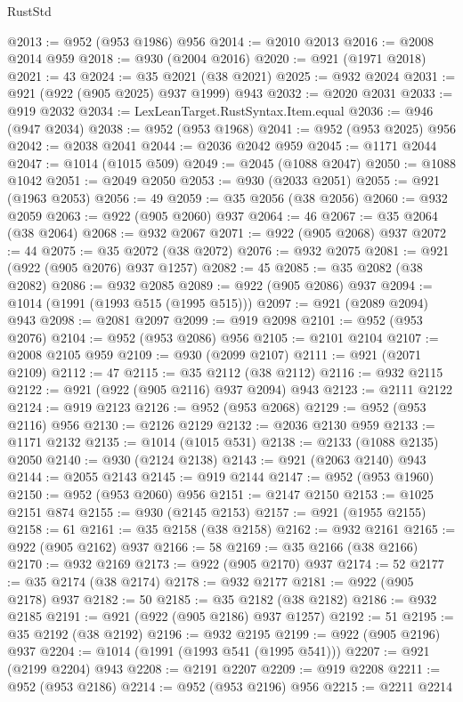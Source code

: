 \begin{lexlean}{RustStd}
\begin{coremodule}
@2013 := @952 (@953 @1986) @956
@2014 := @2010 @2013
@2016 := @2008 @2014 @959
@2018 := @930 (@2004 @2016)
@2020 := @921 (@1971 @2018)
@2021 := 43
@2024 := @35 @2021 (@38 @2021)
@2025 := @932 @2024
@2031 := @921 (@922 (@905 @2025) @937 @1999) @943
@2032 := @2020 @2031
@2033 := @919 @2032
@2034 := LexLeanTarget.RustSyntax.Item.equal
@2036 := @946 (@947 @2034)
@2038 := @952 (@953 @1968)
@2041 := @952 (@953 @2025) @956
@2042 := @2038 @2041
@2044 := @2036 @2042 @959
@2045 := @1171 @2044
@2047 := @1014 (@1015 @509)
@2049 := @2045 (@1088 @2047)
@2050 := @1088 @1042
@2051 := @2049 @2050
@2053 := @930 (@2033 @2051)
@2055 := @921 (@1963 @2053)
@2056 := 49
@2059 := @35 @2056 (@38 @2056)
@2060 := @932 @2059
@2063 := @922 (@905 @2060) @937
@2064 := 46
@2067 := @35 @2064 (@38 @2064)
@2068 := @932 @2067
@2071 := @922 (@905 @2068) @937
@2072 := 44
@2075 := @35 @2072 (@38 @2072)
@2076 := @932 @2075
@2081 := @921 (@922 (@905 @2076) @937 @1257)
@2082 := 45
@2085 := @35 @2082 (@38 @2082)
@2086 := @932 @2085
@2089 := @922 (@905 @2086) @937
@2094 := @1014 (@1991 (@1993 @515 (@1995 @515)))
@2097 := @921 (@2089 @2094) @943
@2098 := @2081 @2097
@2099 := @919 @2098
@2101 := @952 (@953 @2076)
@2104 := @952 (@953 @2086) @956
@2105 := @2101 @2104
@2107 := @2008 @2105 @959
@2109 := @930 (@2099 @2107)
@2111 := @921 (@2071 @2109)
@2112 := 47
@2115 := @35 @2112 (@38 @2112)
@2116 := @932 @2115
@2122 := @921 (@922 (@905 @2116) @937 @2094) @943
@2123 := @2111 @2122
@2124 := @919 @2123
@2126 := @952 (@953 @2068)
@2129 := @952 (@953 @2116) @956
@2130 := @2126 @2129
@2132 := @2036 @2130 @959
@2133 := @1171 @2132
@2135 := @1014 (@1015 @531)
@2138 := @2133 (@1088 @2135) @2050
@2140 := @930 (@2124 @2138)
@2143 := @921 (@2063 @2140) @943
@2144 := @2055 @2143
@2145 := @919 @2144
@2147 := @952 (@953 @1960)
@2150 := @952 (@953 @2060) @956
@2151 := @2147 @2150
@2153 := @1025 @2151 @874
@2155 := @930 (@2145 @2153)
@2157 := @921 (@1955 @2155)
@2158 := 61
@2161 := @35 @2158 (@38 @2158)
@2162 := @932 @2161
@2165 := @922 (@905 @2162) @937
@2166 := 58
@2169 := @35 @2166 (@38 @2166)
@2170 := @932 @2169
@2173 := @922 (@905 @2170) @937
@2174 := 52
@2177 := @35 @2174 (@38 @2174)
@2178 := @932 @2177
@2181 := @922 (@905 @2178) @937
@2182 := 50
@2185 := @35 @2182 (@38 @2182)
@2186 := @932 @2185
@2191 := @921 (@922 (@905 @2186) @937 @1257)
@2192 := 51
@2195 := @35 @2192 (@38 @2192)
@2196 := @932 @2195
@2199 := @922 (@905 @2196) @937
@2204 := @1014 (@1991 (@1993 @541 (@1995 @541)))
@2207 := @921 (@2199 @2204) @943
@2208 := @2191 @2207
@2209 := @919 @2208
@2211 := @952 (@953 @2186)
@2214 := @952 (@953 @2196) @956
@2215 := @2211 @2214

\end{coremodule}
\end{lexlean}
